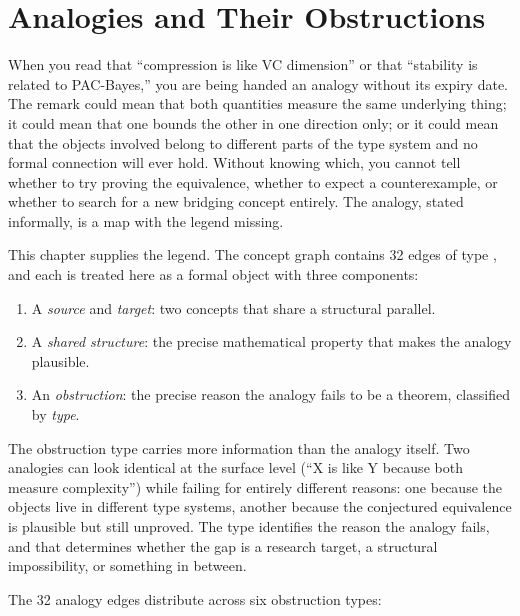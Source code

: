 
\chapter{Analogies and Their Obstructions}
\label{ch:analogies}

When you read that ``compression is like VC dimension'' or that ``stability
is related to PAC-Bayes,'' you are being handed an analogy without its
expiry date. The remark could mean that both quantities measure the same
underlying thing; it could mean that one bounds the other in one direction
only; or it could mean that the objects involved belong to different parts
of the type system and no formal connection will ever hold. Without knowing
which, you cannot tell whether to try proving the equivalence, whether to
expect a counterexample, or whether to search for a new bridging concept
entirely. The analogy, stated informally, is a map with the legend missing.

This chapter supplies the legend. The concept graph contains 32 edges of
type , and each is treated here as a formal object with three
components:

\begin{enumerate}[leftmargin=*, nosep]
\item A \emph{source} and \emph{target}: two concepts that share a
structural parallel.
\item A \emph{shared structure}: the precise mathematical property that
makes the analogy plausible.
\item An \emph{obstruction}: the precise reason the analogy fails to be
a theorem, classified by \emph{type}.
\end{enumerate}

The obstruction type carries more information than the analogy itself. Two
analogies can look identical at the surface level (``X is like Y because
both measure complexity'') while failing for entirely different reasons:
one because the objects live in different type systems, another because the
conjectured equivalence is plausible but still unproved. The type identifies the reason the analogy fails, and that
determines whether the gap is a research target, a structural impossibility,
or something in between.

The 32 analogy edges distribute across six obstruction types:

